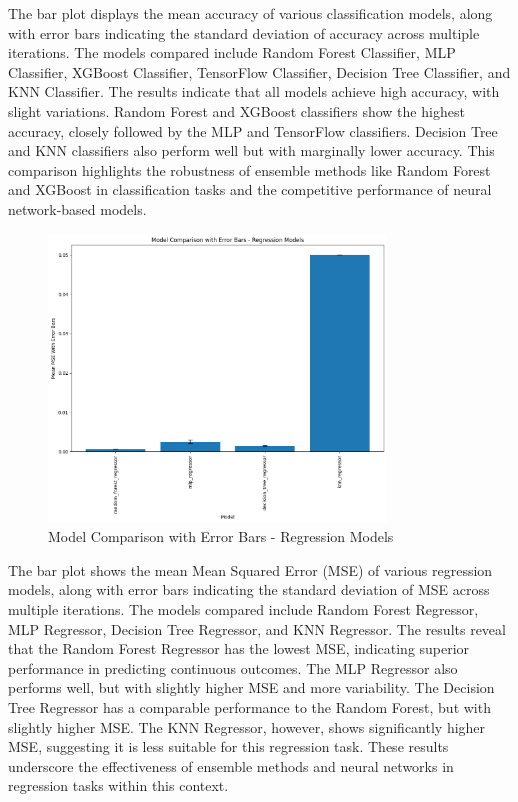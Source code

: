 \documentclass{article}
\begin{document}
The bar plot displays the mean accuracy of various classification models, along with error bars indicating the standard deviation of accuracy across multiple iterations. The models compared include Random Forest Classifier, MLP Classifier, XGBoost Classifier, TensorFlow Classifier, Decision Tree Classifier, and KNN Classifier. The results indicate that all models achieve high accuracy, with slight variations. Random Forest and XGBoost classifiers show the highest accuracy, closely followed by the MLP and TensorFlow classifiers. Decision Tree and KNN classifiers also perform well but with marginally lower accuracy. This comparison highlights the robustness of ensemble methods like Random Forest and XGBoost in classification tasks and the competitive performance of neural network-based models.

\begin{figure}[H]
    \centering
    \includegraphics[width=0.8\textwidth]{images/regression_models.png} %
    \caption{Model Comparison with Error Bars - Regression Models}
    \label{fig:regression_models}
\end{figure}

The bar plot shows the mean Mean Squared Error (MSE) of various regression models, along with error bars indicating the standard deviation of MSE across multiple iterations. The models compared include Random Forest Regressor, MLP Regressor, Decision Tree Regressor, and KNN Regressor. The results reveal that the Random Forest Regressor has the lowest MSE, indicating superior performance in predicting continuous outcomes. The MLP Regressor also performs well, but with slightly higher MSE and more variability. The Decision Tree Regressor has a comparable performance to the Random Forest, but with slightly higher MSE. The KNN Regressor, however, shows significantly higher MSE, suggesting it is less suitable for this regression task. These results underscore the effectiveness of ensemble methods and neural networks in regression tasks within this context.
\end{document}
